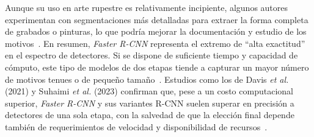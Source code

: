Aunque su uso en arte rupestre es relativamente incipiente, algunos autores experimentan con segmentaciones más detalladas para extraer la forma completa de grabados o pinturas, lo que podría mejorar la documentación y estudio de los motivos~\cite{horn2022,suhaimi2023}.
En resumen, \textit{Faster R-CNN} representa el extremo de “alta exactitud” en el espectro de detectores.
Si se dispone de suficiente tiempo y capacidad de cómputo, este tipo de modelos de dos etapas tiende a capturar un mayor número de motivos tenues o de pequeño tamaño~\cite{bai2023}.
Estudios como los de Davis \textit{et al.} (2021) y Suhaimi \textit{et al.} (2023) confirman que, pese a un costo computacional superior, \textit{Faster R-CNN} y sus variantes R-CNN suelen superar en precisión a detectores de una sola etapa, con la salvedad de que la elección final depende también de requerimientos de velocidad y disponibilidad de recursos~\cite{davis2021,suhaimi2023}.

